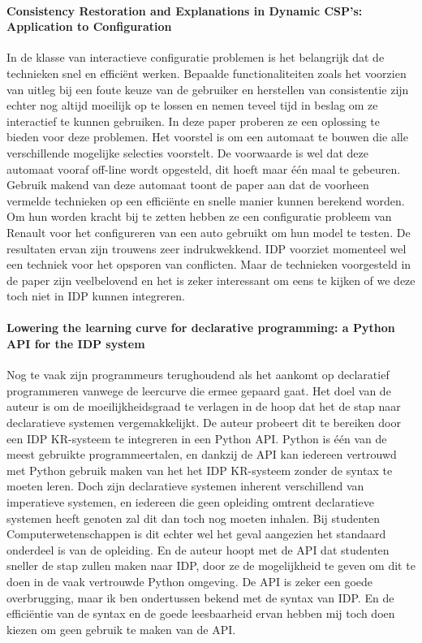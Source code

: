 \paragraph{Consistency Restoration and Explanations in Dynamic CSP's: Application to Configuration \cite{amilhastre2002consistency}}
In de klasse van interactieve configuratie problemen is het belangrijk dat de technieken snel en effici\"{e}nt werken. Bepaalde functionaliteiten zoals het voorzien van uitleg bij een foute keuze van de gebruiker en herstellen van consistentie zijn echter nog altijd moeilijk op te lossen en nemen teveel tijd in beslag om ze interactief te kunnen gebruiken. In deze paper proberen ze een oplossing te bieden voor deze problemen. Het voorstel is om een automaat te bouwen die alle verschillende mogelijke selecties voorstelt. De voorwaarde is wel dat deze automaat vooraf off-line wordt opgesteld, dit hoeft maar \'{e}\'{e}n maal te gebeuren. Gebruik makend van deze automaat toont de paper aan dat de voorheen vermelde technieken op een effici\"{e}nte en snelle manier kunnen berekend worden. Om hun worden kracht bij te zetten hebben ze een configuratie probleem van Renault voor het configureren van een auto gebruikt om hun model te testen. De resultaten ervan zijn trouwens zeer indrukwekkend. IDP voorziet momenteel wel een techniek voor het opsporen van conflicten. Maar de technieken voorgesteld in de paper zijn veelbelovend en het is zeker interessant om eens te kijken of we deze toch niet in IDP kunnen integreren. 

\paragraph{Lowering the learning curve for declarative programming: a Python API for the IDP system \cite{vennekens2015lowering}}
Nog te vaak zijn programmeurs terughoudend als het aankomt op declaratief programmeren vanwege de leercurve die ermee gepaard gaat. Het doel van de auteur is om de moeilijkheidsgraad te verlagen in de hoop dat het de stap naar declaratieve systemen vergemakkelijkt. De auteur probeert dit te bereiken door een IDP KR-systeem te integreren in een Python API. Python is \'{e}\'{e}n van de meest gebruikte programmeertalen, en dankzij de API kan iedereen vertrouwd met Python gebruik maken van het het IDP KR-systeem zonder de syntax te moeten leren. 
Doch zijn declaratieve systemen inherent verschillend van imperatieve systemen, en iedereen die geen opleiding omtrent declaratieve systemen heeft genoten zal dit dan toch nog moeten inhalen. Bij studenten Computerwetenschappen is dit echter wel het geval aangezien het standaard onderdeel is van de opleiding. En de auteur hoopt met de API dat studenten sneller de stap zullen maken naar IDP, door ze de mogelijkheid te geven om dit te doen in de vaak vertrouwde Python omgeving.
De API is zeker een goede overbrugging, maar ik ben ondertussen bekend met de syntax van IDP. En de effici\"{e}ntie van de syntax en de goede leesbaarheid ervan hebben mij toch doen kiezen om geen gebruik te maken van de API. 

